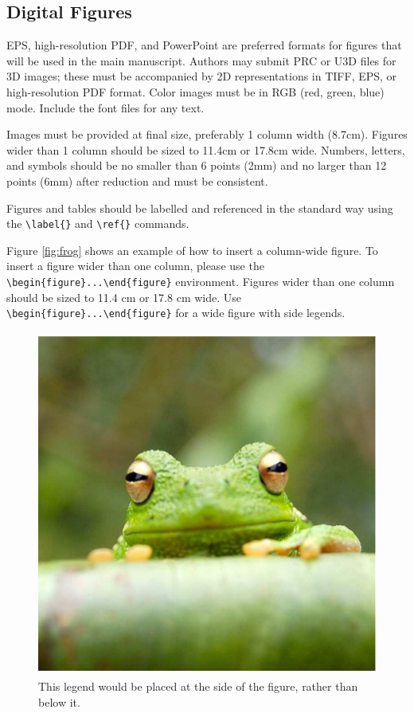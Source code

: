 \documentclass[9pt,twocolumn,twoside]{pnas-new}
\begin{document}
\subsection*{Digital Figures}

EPS, high-resolution PDF, and PowerPoint are preferred formats for figures that will be used in the main manuscript. Authors may submit PRC or U3D files for 3D images; these must be accompanied by 2D representations in TIFF, EPS, or high-resolution PDF format. Color images must be in RGB (red, green, blue) mode. Include the font files for any text.

Images must be provided at final size, preferably 1 column width (8.7cm). Figures wider than 1 column should be sized to 11.4cm or 17.8cm wide. Numbers, letters, and symbols should be no smaller than 6 points (2mm) and no larger than 12 points (6mm) after reduction and must be consistent.

Figures and tables should be labelled and referenced in the standard way using the \verb|\label{}| and \verb|\ref{}| commands.

Figure \ref{fig:frog} shows an example of how to insert a column-wide figure. To insert a figure wider than one column, please use the \verb|\begin{figure}...\end{figure}| environment. Figures wider than one column should be sized to 11.4 cm or 17.8 cm wide. Use \verb|\begin{figure}...\end{figure}| for a wide figure with side legends.

\begin{figure}
\centering
\includegraphics[width=11.4cm,height=11.4cm]{frog.pdf}
\caption{This legend would be placed at the side of the figure, rather than below it.}\label{fig:side}
\end{figure}
\end{document}
